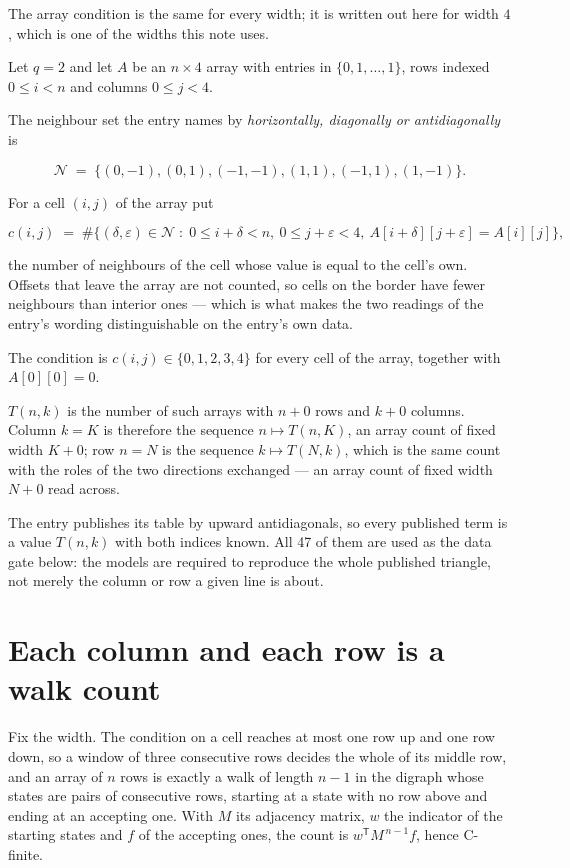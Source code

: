 \documentclass[11pt]{article}
\theoremstyle{definition}
\begin{document}
The array condition is the same for every width; it is written out here for width $4$, which is one of the widths this note uses.

Let $q = 2$ and let $A$ be an $n \times 4$ array with entries in $\{0,1,\dots,1\}$, rows indexed $0 \le i < n$ and columns $0 \le j < 4$.

The neighbour set the entry names by {\itshape horizontally, diagonally or antidiagonally} is

\[\mathcal{N} \;=\; \{(0,-1), (0,1), (-1,-1), (1,1), (-1,1), (1,-1)\}.\]

For a cell $(i,j)$ of the array put

\[c(i,j) \;=\; \#\bigl\{(\delta,\varepsilon)\in\mathcal{N} \;:\; 0\le i+\delta<n,\ 0\le j+\varepsilon<4,\ A[i+\delta][j+\varepsilon] = A[i][j]\bigr\},\]

the number of neighbours of the cell whose value is equal to the cell's own. Offsets that leave the array are not counted, so cells on the border have fewer neighbours than interior ones --- which is what makes the two readings of the entry's wording distinguishable on the entry's own data.

The condition is $c(i,j) \in \{0, 1, 2, 3, 4\}$ for every cell of the array, together with $A[0][0]=0$.

$T(n,k)$ is the number of such arrays with $n + 0$ rows and $k + 0$ columns. Column $k = K$ is therefore the sequence $n \mapsto T(n,K)$, an array count of fixed width $K + 0$; row $n = N$ is the sequence $k \mapsto T(N,k)$, which is the same count with the roles of the two directions exchanged --- an array count of fixed width $N + 0$ read across.

The entry publishes its table by upward antidiagonals, so every published term is a value $T(n,k)$ with both indices known. All 47 of them are used as the data gate below: the models are required to reproduce the whole published triangle, not merely the column or row a given line is about.

\section{Each column and each row is a walk count}

Fix the width. The condition on a cell reaches at most one row up and one row down, so a window of three consecutive rows decides the whole of its middle row, and an array of $n$ rows is exactly a walk of length $n-1$ in the digraph whose states are pairs of consecutive rows, starting at a state with no row above and ending at an accepting one. With $M$ its adjacency matrix, $w$ the indicator of the starting states and $f$ of the accepting ones, the count is $w^{\mathsf T}M^{\,n-1}f$, hence C-finite.
\end{document}
